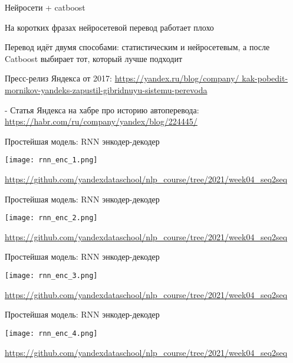 \documentclass[notes,12pt, aspectratio=169]{beamer}
\newenvironment{wideitemize}{\itemize\addtolength{\itemsep}{10pt}}{\enditemize}
\begin{document}
\begin{frame}{Нейросети + catboost}
	\begin{wideitemize} 
		\item  На коротких фразах нейросетевой перевод работает плохо
		\item  Перевод идёт двумя способами: статистическим и нейросетевым, а после Catboost выбирает тот, который лучше подходит
		\item  Пресс-релиз Яндекса от 2017:  \url{https://yandex.ru/blog/company/ kak-pobedit-mornikov-yandeks-zapustil-gibridnuyu-sistemu-perevoda}
		\item  - Статья Яндекса на хабре про историю автоперевода: \url{https://habr.com/ru/company/yandex/blog/224445/}
	\end{wideitemize} 
\end{frame} 



\begin{frame}{Простейшая модель: RNN энкодер-декодер}
	\begin{center}
		\texttt{[image: rnn\_enc\_1.png]}
	\end{center}
	\vfill
	\footnotesize  {\color{blue} \url{https://github.com/yandexdataschool/nlp_course/tree/2021/week04_seq2seq}} 
\end{frame} 


\begin{frame}{Простейшая модель: RNN энкодер-декодер}
	\begin{center}
		\texttt{[image: rnn\_enc\_2.png]}
	\end{center}
	\vfill
	\footnotesize  {\color{blue} \url{https://github.com/yandexdataschool/nlp_course/tree/2021/week04_seq2seq}} 
\end{frame} 


\begin{frame}{Простейшая модель: RNN энкодер-декодер}
	\begin{center}
		\texttt{[image: rnn\_enc\_3.png]}
	\end{center}
	\vfill
	\footnotesize  {\color{blue} \url{https://github.com/yandexdataschool/nlp_course/tree/2021/week04_seq2seq}} 
\end{frame} 


\begin{frame}{Простейшая модель: RNN энкодер-декодер}
	\begin{center}
		\texttt{[image: rnn\_enc\_4.png]}
	\end{center}
	\vfill
	\footnotesize  {\color{blue} \url{https://github.com/yandexdataschool/nlp_course/tree/2021/week04_seq2seq}} 
\end{frame} 
\end{document}
